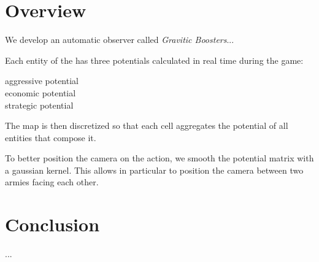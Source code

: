 \documentclass{jfsma}
\begin{document}
\section{Overview}
We develop an automatic observer called \emph{Gravitic Boosters}...

Each entity of the has three potentials calculated in real time during the game:
\begin{description}
\item[aggressive potential]
\item[economic potential]
\item[strategic potential]
\end{description}

The map is then discretized so that each cell aggregates the potential of all entities that compose it.

To better position the camera on the action, we smooth the potential matrix with a gaussian kernel. This allows in particular to position the camera between two armies facing each other.
        
\section{Conclusion}
...
\end{document}
